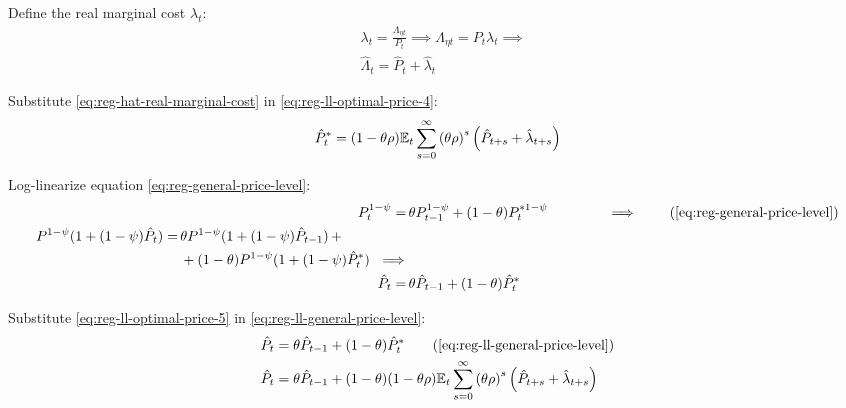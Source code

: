 \documentclass[
	thesis.tex
	]{subfiles}
\begin{document}
Define the real marginal cost $\lambda_t$:
\begin{align}
	& \lambda_t = \frac{\Lambda_{\eta t}}{P_t} \implies \Lambda_{\eta t} = P_t \lambda_t \implies \nonumber \\
	& \hat{\Lambda}_t = \hat{P}_t + \hat{\lambda}_t \label{eq:reg-hat-real-marginal-cost}
\end{align}

Substitute \ref{eq:reg-hat-real-marginal-cost} in \ref{eq:reg-ll-optimal-price-4}:
\begin{align}
	\hat{P}_t^\ast = (1- \theta \rho) {\mathbb{E}_{t}} \sum_{s=0}^{\infty} \left( \theta \rho \right)^s \left( \hat{P}_{t+s} + \hat{\lambda}_{t+s} \right) \label{eq:reg-ll-optimal-price-5}
\end{align}

Log-linearize equation \ref{eq:reg-general-price-level}:
\begin{align}
	P_t^{1-\psi} =\, &\theta P_{t-1}^{1-\psi} + (1-\theta) P_t^{\ast 1-\psi} \qquad \qquad \implies \tag{\ref{eq:reg-general-price-level}} \\
	\begin{split} P^{1-\psi} (1 + (1-\psi)\hat{P}_t) =\, &\theta P^{1-\psi} (1 + (1-\psi)\hat{P}_{t-1}) \, + \\ & + (1-\theta) P^{1-\psi} (1 + (1-\psi)\hat{P}_t^\ast) \ \implies \nonumber \end{split} \\
	\hat{P}_t =\, &\theta \hat{P}_{t-1} + (1-\theta) \hat{P}_t^\ast
	\label{eq:reg-ll-general-price-level}
\end{align}

Substitute \ref{eq:reg-ll-optimal-price-5} in \ref{eq:reg-ll-general-price-level}:
\begin{align}
	\hat{P}_t &= \theta \hat{P}_{t-1} + (1-\theta) \hat{P}_t^\ast \tag{\ref{eq:reg-ll-general-price-level}}\\
	\hat{P}_t &= \theta \hat{P}_{t-1} + (1-\theta) (1- \theta \rho) \E \sum_{s=0}^{\infty} \left( \theta \rho \right)^s \left( \hat{P}_{t+s} + \hat{\lambda}_{t+s} \right) \label{eq:reg-ll-general-price-level-2}
\end{align}
\end{document}
